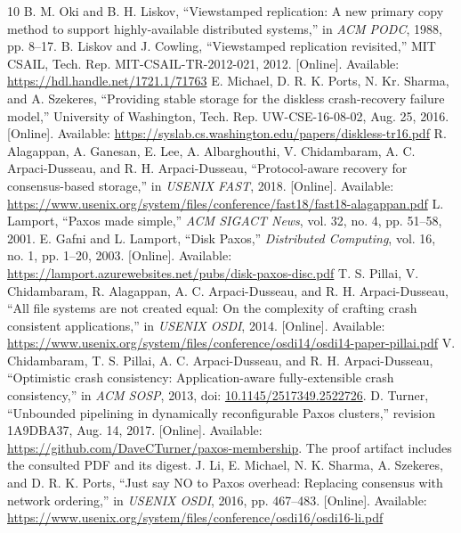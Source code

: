 \documentclass[10pt,journal,letterpaper]{IEEEtran}
\begin{document}
\begin{thebibliography}{10}
 B. M. Oki and B. H. Liskov, ``Viewstamped replication: A new primary copy method to support highly-available distributed systems,'' in \emph{ACM PODC}, 1988, pp. 8--17.
 B. Liskov and J. Cowling, ``Viewstamped replication revisited,'' MIT CSAIL, Tech. Rep. MIT-CSAIL-TR-2012-021, 2012. [Online]. Available: \url{https://hdl.handle.net/1721.1/71763}
 E. Michael, D. R. K. Ports, N. Kr. Sharma, and A. Szekeres, ``Providing stable storage for the diskless crash-recovery failure model,'' University of Washington, Tech. Rep. UW-CSE-16-08-02, Aug. 25, 2016. [Online]. Available: \url{https://syslab.cs.washington.edu/papers/diskless-tr16.pdf}
 R. Alagappan, A. Ganesan, E. Lee, A. Albarghouthi, V. Chidambaram, A. C. Arpaci-Dusseau, and R. H. Arpaci-Dusseau, ``Protocol-aware recovery for consensus-based storage,'' in \emph{USENIX FAST}, 2018. [Online]. Available: \url{https://www.usenix.org/system/files/conference/fast18/fast18-alagappan.pdf}
 L. Lamport, ``Paxos made simple,'' \emph{ACM SIGACT News}, vol. 32, no. 4, pp. 51--58, 2001.
 E. Gafni and L. Lamport, ``Disk Paxos,'' \emph{Distributed Computing}, vol. 16, no. 1, pp. 1--20, 2003. [Online]. Available: \url{https://lamport.azurewebsites.net/pubs/disk-paxos-disc.pdf}
 T. S. Pillai, V. Chidambaram, R. Alagappan, A. C. Arpaci-Dusseau, and R. H. Arpaci-Dusseau, ``All file systems are not created equal: On the complexity of crafting crash consistent applications,'' in \emph{USENIX OSDI}, 2014. [Online]. Available: \url{https://www.usenix.org/system/files/conference/osdi14/osdi14-paper-pillai.pdf}
 V. Chidambaram, T. S. Pillai, A. C. Arpaci-Dusseau, and R. H. Arpaci-Dusseau, ``Optimistic crash consistency: Application-aware fully-extensible crash consistency,'' in \emph{ACM SOSP}, 2013, doi: \href{https://doi.org/10.1145/2517349.2522726}{10.1145/2517349.2522726}.
 D. Turner, ``Unbounded pipelining in dynamically reconfigurable Paxos clusters,'' revision 1A9DBA37, Aug. 14, 2017. [Online]. Available: \url{https://github.com/DaveCTurner/paxos-membership}. The proof artifact includes the consulted PDF and its digest.
 J. Li, E. Michael, N. K. Sharma, A. Szekeres, and D. R. K. Ports, ``Just say NO to Paxos overhead: Replacing consensus with network ordering,'' in \emph{USENIX OSDI}, 2016, pp. 467--483. [Online]. Available: \url{https://www.usenix.org/system/files/conference/osdi16/osdi16-li.pdf}

\end{thebibliography}
\end{document}
